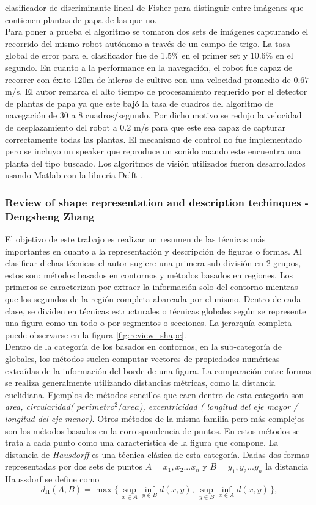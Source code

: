 	 clasificador de discriminante lineal de Fisher \cite{HastieEtAl2008} para distinguir 
	 entre imágenes que contienen plantas de papa de las que no.\\
	 \indent Para poner a prueba el algoritmo se tomaron dos sets de 
	 imágenes capturando el recorrido del mismo robot autónomo a 
	 través de un campo de trigo. La tasa global de error para el 
	 clasificador fue de 1.5\% en el primer set y 10.6\% en el 
	 segundo. En cuanto a la performance en la navegación, el robot 
	 fue capaz de recorrer con éxito 120m de hileras de cultivo con 
	 una velocidad promedio de $0.67$ m/s. El autor remarca el alto 
	 tiempo de procesamiento requerido por el detector de plantas de 
	 papa ya que este bajó la tasa de cuadros del algoritmo de 
	 navegación de 30 a 8 cuadros/segundo. Por dicho motivo se 
	 redujo la velocidad de desplazamiento del robot a 0.2 m/s para 
	 que este sea capaz de capturar correctamente todas las plantas. 
	 El mecanismo de control no fue implementado pero se incluyo un 
	 speaker que reproduce un sonido cuando este encuentra una planta 
	 del tipo buscado. Los algoritmos de visión utilizados fueron 
	 desarrollados usando Matlab con la librería Delft \cite{DipLib}.
	 
	\subsubsection{Review of shape representation and description techinques - Dengsheng Zhang}
El objetivo de este trabajo es realizar un resumen de las técnicas más 
importantes en cuanto a la representación y descripción de figuras o 
formas.
Al clasificar dichas técnicas el autor sugiere una primera sub-división en 2 grupos, estos son: métodos basados en contornos y métodos basados 
en regiones. Los primeros se caracterizan por extraer  la información solo del contorno mientras que los segundos de la región completa abarcada
por el mismo. Dentro de cada clase, se dividen en técnicas 
estructurales o técnicas globales según  se represente una figura como un todo o 
por segmentos o secciones. La jerarquía completa puede observarse en la figura \ref{fig:review_shape}.\\
\indent Dentro de la categoría de los basados en contornos, en la sub-categoría de globales, los métodos suelen computar vectores de 
propiedades numéricas extraídas de la información del borde de una 
figura. La comparación entre formas se realiza 
generalmente utilizando distancias métricas, como la distancia euclidiana. Ejemplos de métodos sencillos que caen dentro de esta 
categoría son \textit{area, circularidad( $perimetro^2 / area$), 
excentricidad ( longitud del eje mayor / longitud del eje menor)}. Otros métodos 
de la misma familia pero más complejos son los métodos basados en la correspondencia de puntos. En estos métodos se trata a cada punto como una 
característica de la figura que compone. La distancia de \textit{ Hausdorff} es una técnica clásica de esta categoría. Dadas dos formas representadas
por dos sets de puntos $A={x_1,x_2...x_n}$ y $B={y_1,y_2...y_n}$ la distancia Haussdorf se define como 
\[
	 d_{\mathrm H}(A,B) = \max\{\,\sup_{x \in A} \inf_{y \in B} d(x,y),\, \sup_{y \in B} \inf_{x \in A} d(x,y)\,\}\mbox{,}
\] 

